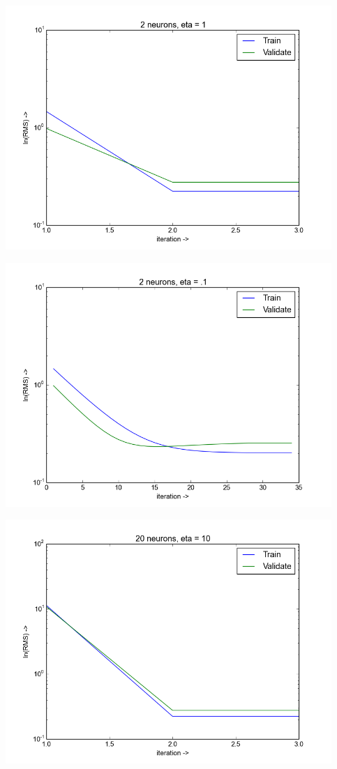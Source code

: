 \documentclass{article}
\theoremstyle{dotless}
\begin{document}
\includegraphics[keepaspectratio=true, width=350pt]{src/img/n_2_eta_1.png}

\includegraphics[keepaspectratio=true, width=350pt]{src/img/n_2_eta_01.png}

\includegraphics[keepaspectratio=true, width=350pt]{src/img/n_20_eta_10.png}
\end{document}
